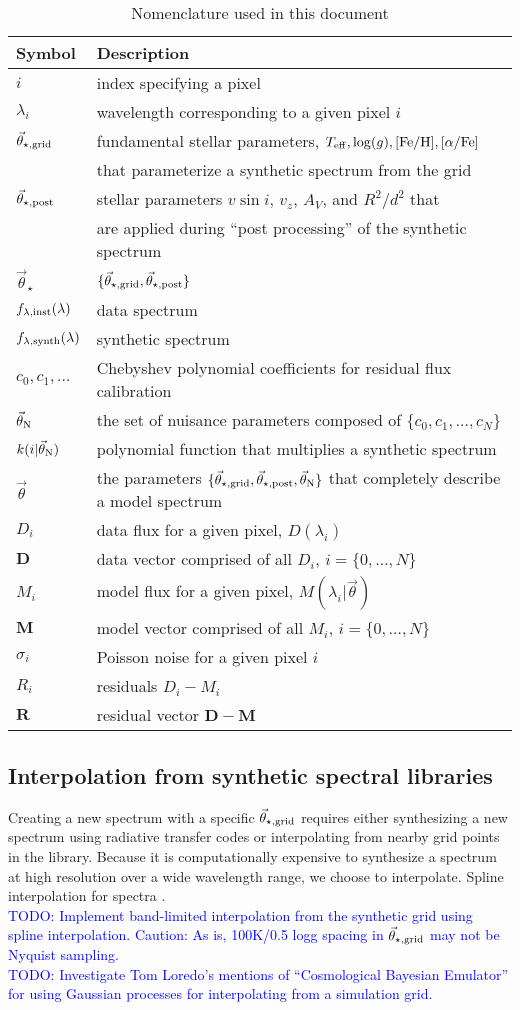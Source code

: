 \documentclass[iop,floatfix]{emulateapj}
\newcommand{\vt}{\vec{\theta}}
\newcommand{\vg}{\vt_{\star, {\rm grid}}}
\newcommand{\vpp}{\vt_{\star, {\rm post}}}
\newcommand{\vstar}{\vt_{\star}}
\newcommand{\finst}{f_{\lambda, {\rm inst}}}
\newcommand{\fsynth}{f_{\lambda, {\rm synth}}}
\newcommand{\vN}{\vt_{\rm N}}
\newcommand{\fM}{ {\bm M}}
\newcommand{\fMi}{M_i}
\newcommand{\fD}{ {\bm D}}
\newcommand{\fDi}{D_i}
\newcommand{\fR}{ {\bm R}}
\newcommand{\Z}{[{\rm Fe}/{\rm H}]}
\newcommand{\A}{[\alpha/{\rm Fe}]}
\newcommand{\todo}[1]{ \textcolor{Blue}{\\TODO: #1}}
\begin{document}
\begin{table}[!htb]
\begin{tabular}{ll}
\hline
\hline
Symbol & Description\\
\hline
\hline
$i$ & index specifying a pixel\\
$\lambda_i$ & wavelength corresponding to a given pixel $i$\\
$\vg$ & fundamental stellar parameters, $T_{\rm eff}, \log(g), \Z, \A$\\
  & that parameterize a synthetic spectrum from the grid\\
$\vpp$ & stellar parameters $v \sin i$, $v_z$, $A_V$, and $R^2/d^2$ that\\
  & are applied during ``post processing'' of the synthetic spectrum\\
$\vstar$ & $\{\vg,\vpp \}$\\
$\finst(\lambda)$ & data spectrum\\
$\fsynth(\lambda)$ & synthetic spectrum\\
$c_0, c_1, \ldots$ & Chebyshev polynomial coefficients for residual flux calibration\\
$\vN$ & the set of nuisance parameters composed of $\{c_0, c_1, \ldots, c_N\}$\\
$k(i | \vN)$  & polynomial function that multiplies a synthetic spectrum\\
$\vt$ & the parameters $\{\vg, \vpp, \vN\}$ that completely describe a model spectrum\\
$\fDi$ & data flux for a given pixel, $D(\lambda_i)$\\
$\fD$ & data vector comprised of all $\fDi$, $i = \{0, \ldots, N\}$\\
$\fMi$ & model flux for a given pixel, $M(\lambda_i | \vt)$\\
$\fM$ & model vector comprised of all $\fMi$, $i = \{0, \ldots, N\}$\\
$\sigma_i$ & Poisson noise for a given pixel $i$\\
$R_i$ & residuals $\fDi - \fMi$\\
$\fR$ & residual vector $\fD - \fM$\\
\hline
\end{tabular}
\caption{Nomenclature used in this document}
\label{tab:nomenclature}
\end{table}

\subsection{Interpolation from synthetic spectral libraries}
Creating a new spectrum with a specific $\vg$ requires either synthesizing a new spectrum using radiative transfer codes or interpolating from nearby grid points in the library. Because it is computationally expensive to synthesize a spectrum at high resolution over a wide wavelength range, we choose to interpolate. Spline interpolation for spectra \citep{hus12}.
\todo{Implement band-limited interpolation from the synthetic grid using spline interpolation. Caution: As is, 100K/0.5 logg spacing in $\vg$ may not be Nyquist sampling.}
\todo{Investigate Tom Loredo's mentions of ``Cosmological Bayesian Emulator'' for using Gaussian processes for interpolating from a simulation grid.}
\end{document}
